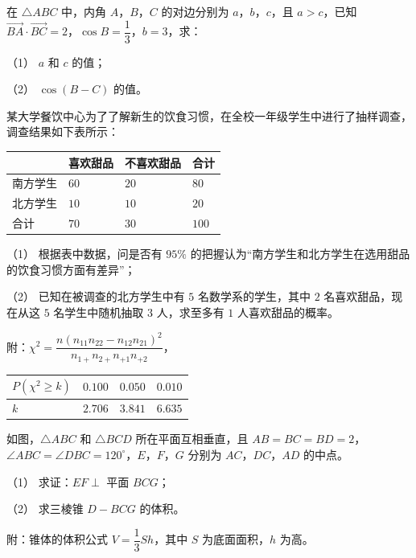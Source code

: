 \begin{question}
在 $\triangle ABC$ 中，内角 $A$，$B$，$C$ 的对边分别为 $a$，$b$，$c$，且 $a>c$，已知 $\overrightarrow{BA}\cdot\overrightarrow{BC}=2$，$\cos B=\dfrac13$，$b=3$，求：

（1） $a$ 和 $c$ 的值；

（2） $\cos(B-C)$ 的值。

\end{question}
\begin{question}
某大学餐饮中心为了了解新生的饮食习惯，在全校一年级学生中进行了抽样调查，调查结果如下表所示：

\begin{center}
\begin{tabular}{llll}
\toprule
 & 喜欢甜品 & 不喜欢甜品 & 合计 \\
\midrule
南方学生 & $60$ & $20$ & $80$ \\
北方学生 & $10$ & $10$ & $20$ \\
合计 & $70$ & $30$ & $100$ \\
\bottomrule
\end{tabular}
\end{center}

（1） 根据表中数据，问是否有 $95\%$ 的把握认为“南方学生和北方学生在选用甜品的饮食习惯方面有差异”；

（2） 已知在被调查的北方学生中有 $5$ 名数学系的学生，其中 $2$ 名喜欢甜品，现在从这 $5$ 名学生中随机抽取 $3$ 人，求至多有 $1$ 人喜欢甜品的概率。

附：$\chi^2=\dfrac{n(n_{11}n_{22}-n_{12}n_{21})^2}{n_{1+}n_{2+}n_{+1}n_{+2}}$，

\begin{center}
\begin{tabular}{llll}
\toprule
$P(\chi^2\geqslant k)$ & $0.100$ & $0.050$ & $0.010$ \\
\midrule
$k$ & $2.706$ & $3.841$ & $6.635$ \\
\bottomrule
\end{tabular}
\end{center}

\Needspace{0.4\textheight}
\end{question}
\begin{question}
如图，$\triangle ABC$ 和 $\triangle BCD$ 所在平面互相垂直，且 $AB=BC=BD=2$，$\angle ABC=\angle DBC=120^\circ$，$E$，$F$，$G$ 分别为 $AC$，$DC$，$AD$ 的中点。
\nopagebreak[4]
\begin{center}\end{center}
\nopagebreak[4]
（1） 求证：$EF\perp$ 平面 $BCG$；

（2） 求三棱锥 $D-BCG$ 的体积。

附：锥体的体积公式 $V=\dfrac13Sh$，其中 $S$ 为底面面积，$h$ 为高。

\Needspace{0.4\textheight}
\end{question}
